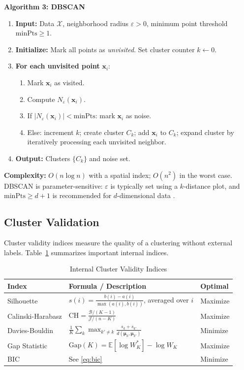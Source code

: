 \documentclass[conference]{IEEEtran}
\begin{document}
\textbf{Algorithm 3: DBSCAN}
\begin{enumerate}
    \item \textbf{Input:} Data $\mathcal{X}$, neighborhood radius $\varepsilon > 0$, minimum point threshold $\mathrm{minPts} \geq 1$.
    \item \textbf{Initialize:} Mark all points as \textit{unvisited}. Set cluster counter $k \leftarrow 0$.
    \item \textbf{For each unvisited point} $\mathbf{x}_i$:
        \begin{enumerate}
            \item Mark $\mathbf{x}_i$ as visited.
            \item Compute $N_\varepsilon(\mathbf{x}_i)$.
            \item If $|N_\varepsilon(\mathbf{x}_i)| < \mathrm{minPts}$: mark $\mathbf{x}_i$ as noise.
            \item Else: increment $k$; create cluster $C_k$; add $\mathbf{x}_i$ to $C_k$; expand cluster by iteratively processing each unvisited neighbor.
        \end{enumerate}
    \item \textbf{Output:} Clusters $\{C_k\}$ and noise set.
\end{enumerate}

\textbf{Complexity:} $O(n \log n)$ with a spatial index; $O(n^2)$ in the worst case. DBSCAN is parameter-sensitive: $\varepsilon$ is typically set using a $k$-distance plot, and $\mathrm{minPts} \geq d + 1$ is recommended for $d$-dimensional data \cite{ester1996density}.

\subsection{Cluster Validation}

Cluster validity indices measure the quality of a clustering without external labels. Table~\ref{tab:validity} summarizes important internal indices.

\begin{table}[h]
\caption{Internal Cluster Validity Indices}
\label{tab:validity}
\centering
\renewcommand{\arraystretch}{1.3}
\begin{tabular}{p{2.2cm} p{3.8cm} p{1.6cm}}
\toprule
\textbf{Index} & \textbf{Formula / Description} & \textbf{Optimal} \\
\midrule
Silhouette \cite{rousseeuw1987silhouettes} & $s(i) = \frac{b(i)-a(i)}{\max(a(i),b(i))}$, averaged over $i$ & Maximize \\
Calinski-Harabasz \cite{calinski1974dendrite} & $\mathrm{CH} = \frac{\mathcal{B}/(K-1)}{\mathcal{J}/(n-K)}$ & Maximize \\
Davies-Bouldin \cite{davies1979cluster} & $\frac{1}{K}\sum_k \max_{k'\neq k}\frac{s_k + s_{k'}}{d(\boldsymbol{\mu}_k, \boldsymbol{\mu}_{k'})}$ & Minimize \\
Gap Statistic \cite{tibshirani2001estimating} & $\mathrm{Gap}(K) = \mathbb{E}[\log W_K^*] - \log W_K$ & Maximize \\
BIC & See \eqref{eq:bic} & Minimize \\
\bottomrule
\end{tabular}
\end{table}
\end{document}
